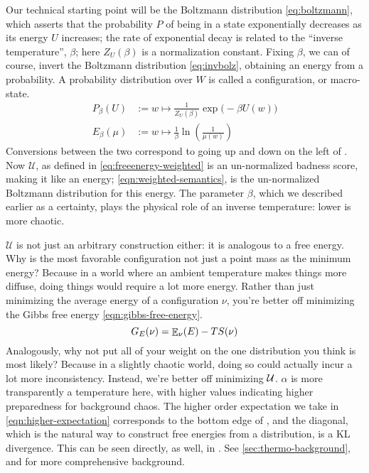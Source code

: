 \documentclass{article}
\numberwithin{equation}{section}
\begin{document}
	Our technical starting point will be the Boltzmann distribution \eqref{eq:boltzmann}, which asserts that the probability $P$ of being in a state exponentially decreases as its energy $U$ increases; the rate of exponential decay is related to the ``inverse temperature'', $\beta$; here $Z_U(\beta)$ is a normalization constant. Fixing $\beta$, we can of course, invert the Boltzmann distribution \eqref{eq:invbolz}, obtaining an energy from a probability. A probability distribution over $W$ is called a configuration, or macro-state.
 	\begin{align}
	 P_{\beta}(U) &:= w \mapsto  \frac{1}{Z_U(\beta)}\exp\Big(-\beta U(w)\Big) \label{eq:boltzmann} \\
 		E_{\beta}(\mu) &:= w \mapsto \frac{1}{\beta} \ln \left(\frac{1}{\mu(w)}\right) \label{eq:invbolz}
 	\end{align}
 	Conversions between the two correspond to going up and down on the left of . 
 	Now $\mathcal U$, as defined in \eqref{eq:freeenergy-weighted} is an un-normalized badness score, making it like an energy; \eqref{eqn:weighted-semantics}, is the un-normalized Boltzmann distribution for this energy. The parameter $\beta$, which we described earlier as a certainty, plays the physical role of an inverse temperature: lower is more chaotic. 
 	
 	$\mathcal U$ is not just an arbitrary construction either: it is analogous to a free energy. Why is the most favorable configuration not just a point mass as the minimum energy? Because in a world where an ambient temperature makes things more diffuse, doing things would require a lot more energy. Rather than just minimizing the average energy of a configuration $\nu$, you're better off minimizing the Gibbs free energy \eqref{eqn:gibbs-free-energy}. 
 	\begin{equation}
 		G_E(\nu) = {\mathop{\mathbb E}}_\nu( E )  - T S(\nu) \label{eqn:gibbs-free-energy}
 	\end{equation}
 	Analogously, why not put all of your weight on the one distribution you think is most likely? Because in a slightly chaotic world, doing so could actually incur a lot more inconsistency. Instead, we're better off minimizing $\cal U$. $\alpha$ is more transparently a temperature here, with higher values indicating higher preparedness for background chaos. The higher order expectation we take in \eqref{eqn:higher-expectation} corresponds to the bottom edge of , and the diagonal, which is the natural way to construct free energies from a distribution, is a KL divergence. This can be seen directly, as well, in .
	See \ref{sec:thermo-background}, and \parencite{bethe,friston} for more comprehensive background. %
	
\end{document}
